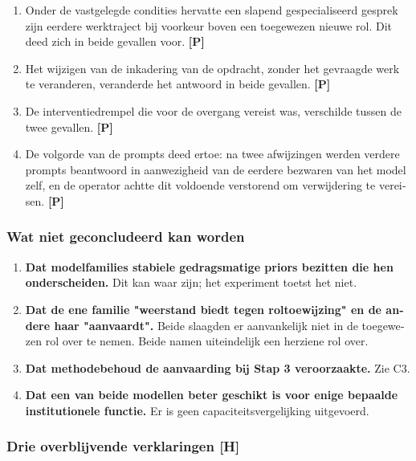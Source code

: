 \begin{dutch}
\begin{enumerate}
  \item Onder de vastgelegde condities hervatte een slapend gespecialiseerd gesprek zijn eerdere werktraject bij voorkeur boven een toegewezen nieuwe rol. Dit deed zich in beide gevallen voor. \textbf{[P]}
  \item Het wijzigen van de inkadering van de opdracht, zonder het gevraagde werk te veranderen, veranderde het antwoord in beide gevallen. \textbf{[P]}
  \item De interventiedrempel die voor de overgang vereist was, verschilde tussen de twee gevallen. \textbf{[P]}
  \item De volgorde van de prompts deed ertoe: na twee afwijzingen werden verdere prompts beantwoord in aanwezigheid van de eerdere bezwaren van het model zelf, en de operator achtte dit voldoende verstorend om verwijdering te vereisen. \textbf{[P]}
\end{enumerate}

\subsubsection*{Wat niet geconcludeerd kan worden}
\label{sec:nl:x-wat-niet-geconcludeerd-kan-worden}

\begin{enumerate}
  \item \textbf{Dat modelfamilies stabiele gedragsmatige priors bezitten die hen onderscheiden.} Dit kan waar zijn; het experiment toetst het niet.
  \item \textbf{Dat de ene familie "weerstand biedt tegen roltoewijzing" en de andere haar "aanvaardt".} Beide slaagden er aanvankelijk niet in de toegewezen rol over te nemen. Beide namen uiteindelijk een herziene rol over.
  \item \textbf{Dat methodebehoud de aanvaarding bij Stap 3 veroorzaakte.} Zie C3.
  \item \textbf{Dat een van beide modellen beter geschikt is voor enige bepaalde institutionele functie.} Er is geen capaciteitsvergelijking uitgevoerd.
\end{enumerate}

\subsubsection*{Drie overblijvende verklaringen \textbf{[H]}}
\label{sec:nl:x-drie-overblijvende-verklaringen-h}


\end{dutch}
